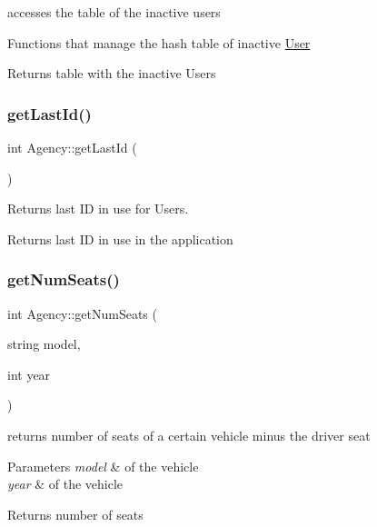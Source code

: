 accesses the table of the inactive users 

Functions that manage the hash table of inactive \hyperlink{class_user}{User} \begin{DoxyReturn}{Returns}
table with the inactive Users 
\end{DoxyReturn}
\mbox{\label{group___agency_ga4f91eb604ad3eb3ea8142b8ab65b968d}} 
\subsubsection{\texorpdfstring{get\+Last\+Id()}{getLastId()}}
{\footnotesize\ttfamily int Agency\+::get\+Last\+Id (\begin{DoxyParamCaption}{ }\end{DoxyParamCaption})}



Returns last ID in use for Users. 

\begin{DoxyReturn}{Returns}
last ID in use in the application 
\end{DoxyReturn}
\mbox{\label{group___agency_ga55fd7b63ca65ffdb6dfe8694301af29c}} 
\subsubsection{\texorpdfstring{get\+Num\+Seats()}{getNumSeats()}}
{\footnotesize\ttfamily int Agency\+::get\+Num\+Seats (\begin{DoxyParamCaption}\item[{string}]{model,  }\item[{int}]{year }\end{DoxyParamCaption})}



returns number of seats of a certain vehicle minus the driver seat 


\begin{DoxyParams}{Parameters}
{\em model} & of the vehicle \\
\hline
{\em year} & of the vehicle\\
\hline
\end{DoxyParams}
\begin{DoxyReturn}{Returns}
number of seats 
\end{DoxyReturn}
\mbox{\label{group___agency_ga7ec884913bb5c9803cc5b71dc4a569d3}} 
